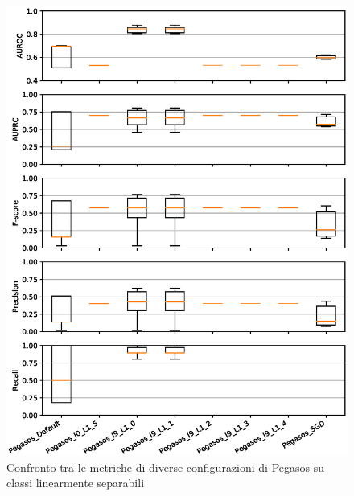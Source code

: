 \documentclass[12pt,a4paper,oneside,hidelinks]{report}
\begin{document}
\begin{figure}[hb]%
    \centering
    \includegraphics[scale = 0.80]{CC-Pegasos-level1-LS.eps}%
    \caption{Confronto tra le metriche di diverse configurazioni di Pegasos su classi linearmente separabili}%
    \label{figure:illps}%
\end{figure}

\vspace*{\fill}
\end{document}
